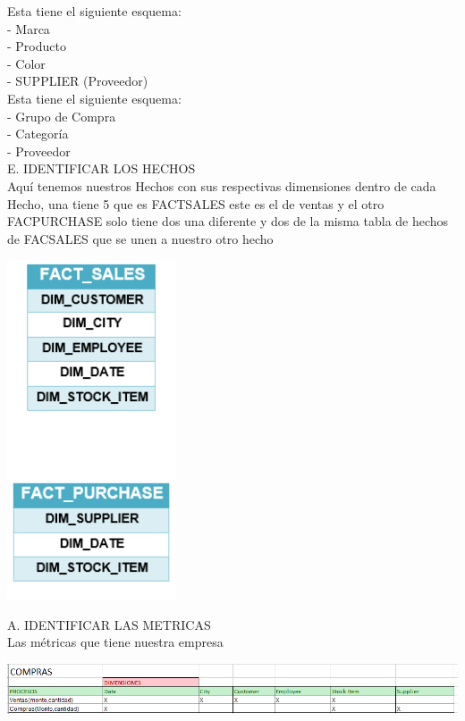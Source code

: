 \documentclass[12pt,letterpaper]{article}
\begin{document}
Esta tiene el siguiente esquema:\\
- Marca\\
- Producto\\
- Color\\

- SUPPLIER (Proveedor)\\

Esta tiene el siguiente esquema:\\
- Grupo de Compra\\
- Categor\'ia\\
- Proveedor\\

E.	IDENTIFICAR LOS HECHOS\\

Aqu\'i tenemos nuestros Hechos con sus respectivas dimensiones dentro de cada Hecho, una tiene 5 que es FACTSALES este es el de ventas y el otro FACPURCHASE solo tiene dos una diferente y dos de la misma tabla de hechos de FACSALES que se unen a nuestro otro hecho\\
\begin{center}
\includegraphics[width=5cm]{IMG/11.png} 
\end{center}

A.	IDENTIFICAR LAS METRICAS\\
Las m\'etricas que tiene nuestra empresa \\


\begin{center}
\includegraphics[width=17cm]{IMG/12.png} 
\end{center}
\end{document}
